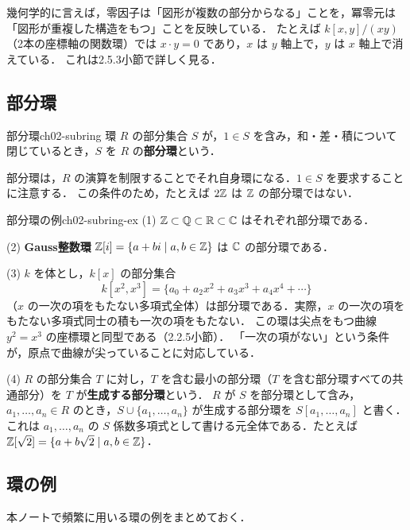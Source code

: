 幾何学的に言えば，零因子は「図形が複数の部分からなる」ことを，冪零元は「図形が重複した構造をもつ」ことを反映している．
たとえば $k[x,y]/(xy)$（2本の座標軸の関数環）では $x\cdot y=0$ であり，$x$ は $y$ 軸上で，$y$ は $x$ 軸上で消えている．
これは2.5.3小節で詳しく見る．

\subsection{部分環}

\begin{mydef}{部分環}{ch02-subring}
環 $R$ の部分集合 $S$ が，$1\in S$ を含み，和・差・積について閉じているとき，$S$ を $R$ の\textbf{部分環}という．
\end{mydef}

部分環は，$R$ の演算を制限することでそれ自身環になる．$1\in S$ を要求することに注意する．
この条件のため，たとえば $2\mathbb{Z}$ は $\mathbb{Z}$ の部分環ではない．

\begin{myex}{部分環の例}{ch02-subring-ex}
(1) $\mathbb{Z}\subset\mathbb{Q}\subset\mathbb{R}\subset\mathbb{C}$ はそれぞれ部分環である．

(2) \textbf{Gauss整数環} $\mathbb{Z}[i]=\{a+bi\mid a,b\in\mathbb{Z}\}$ は $\mathbb{C}$ の部分環である．

(3) $k$ を体とし，$k[x]$ の部分集合
\[
  k[x^2,x^3]=\{a_0+a_2x^2+a_3x^3+a_4x^4+\cdots\}
\]
（$x$ の一次の項をもたない多項式全体）は部分環である．実際，$x$ の一次の項をもたない多項式同士の積も一次の項をもたない．
この環は尖点をもつ曲線 $y^2=x^3$ の座標環と同型である（2.2.5小節）．
「一次の項がない」という条件が，原点で曲線が尖っていることに対応している．

(4) $R$ の部分集合 $T$ に対し，$T$ を含む最小の部分環（$T$ を含む部分環すべての共通部分）を $T$ が\textbf{生成する部分環}という．
$R$ が $S$ を部分環として含み，$a_1,\dots,a_n\in R$ のとき，$S\cup\{a_1,\dots,a_n\}$ が生成する部分環を $S[a_1,\dots,a_n]$ と書く．
これは $a_1,\dots,a_n$ の $S$ 係数多項式として書ける元全体である．たとえば $\mathbb{Z}[\sqrt2]=\{a+b\sqrt2\mid a,b\in\mathbb{Z}\}$．
\end{myex}

\subsection{環の例}

本ノートで頻繁に用いる環の例をまとめておく．

